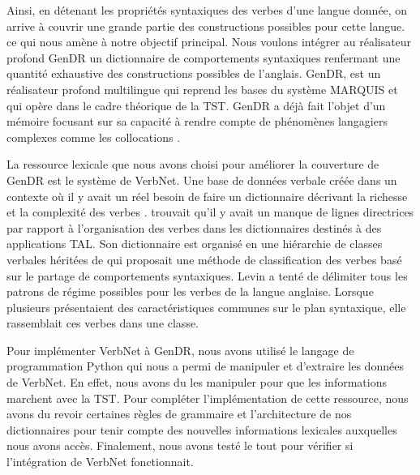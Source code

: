 Ainsi, en détenant les propriétés syntaxiques des verbes d'une langue donnée, on arrive à couvrir une grande partie des constructions possibles pour cette langue. ce qui nous amène à notre objectif principal. Nous voulons intégrer au réalisateur profond GenDR un dictionnaire de comportements syntaxiques renfermant une quantité exhaustive des constructions possibles de l'anglais. GenDR, est un réalisateur profond multilingue qui reprend les bases du système MARQUIS et qui opère dans le cadre théorique de la \ac{TST}. GenDR a déjà fait l'objet d'un mémoire focusant sur sa capacité à rendre compte de phénomènes langagiers complexes comme les collocations \cite{LambreyImplementationcollocationspour2017, lareau18}.

La ressource lexicale que nous avons choisi pour améliorer la couverture de GenDR est le système de  VerbNet. Une base de données verbale créée dans un contexte où il y avait un réel besoin de faire un dictionnaire décrivant la richesse et la complexité des verbes \citep{KipperClassBasedConstructionVerb2000}. \cite{SchulerVerbnetBroadcoverageComprehensive2005} trouvait qu'il y avait un manque de lignes directrices par rapport à l'organisation des verbes dans les dictionnaires destinés à des applications \ac{TAL}. Son dictionnaire est organisé en une hiérarchie de classes verbales héritées de \cite{verb-classes.levin.1993} qui proposait une méthode de classification des verbes basé sur le partage de comportements syntaxiques. Levin a tenté de délimiter tous les patrons de régime possibles pour les verbes de la langue anglaise. Lorsque plusieurs présentaient des caractéristiques communes sur le plan syntaxique, elle rassemblait ces verbes dans une classe.

Pour implémenter VerbNet à GenDR, nous avons utilisé le langage de programmation Python qui nous a permi de manipuler et d'extraire les données de VerbNet. En effet, nous avons du les manipuler pour que les informations marchent avec la TST. Pour compléter l'implémentation de cette ressource, nous avons du revoir certaines règles de grammaire et l'architecture de nos dictionnaires pour tenir compte des nouvelles informations lexicales auxquelles nous avons accès. Finalement, nous avons testé le tout pour vérifier si l'intégration de VerbNet fonctionnait.


